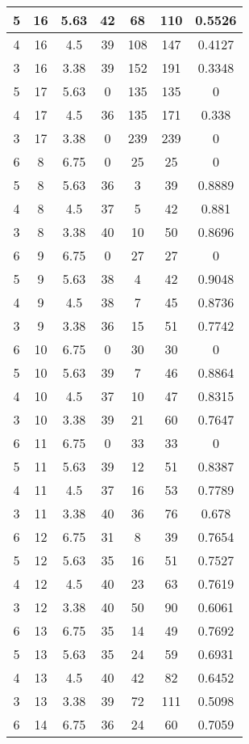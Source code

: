 \documentclass[letterpaper, 12pt]{article}
\begin{document}
\begin{longtable}{|c|c|c|c|c|c|c|}
\hline
5 & 16 & 5.63 & 42 & 68 & 110 & 0.5526 \\
\hline
4 & 16 & 4.5 & 39 & 108 & 147 & 0.4127 \\
\hline
3 & 16 & 3.38 & 39 & 152 & 191 & 0.3348 \\
\hline
5 & 17 & 5.63 & 0 & 135 & 135 & 0 \\
\hline
4 & 17 & 4.5 & 36 & 135 & 171 & 0.338 \\
\hline
3 & 17 & 3.38 & 0 & 239 & 239 & 0 \\
\hline
6 & 8 & 6.75 & 0 & 25 & 25 & 0 \\
\hline
5 & 8 & 5.63 & 36 & 3 & 39 & 0.8889 \\
\hline
4 & 8 & 4.5 & 37 & 5 & 42 & 0.881 \\
\hline
3 & 8 & 3.38 & 40 & 10 & 50 & 0.8696 \\
\hline
6 & 9 & 6.75 & 0 & 27 & 27 & 0 \\
\hline
5 & 9 & 5.63 & 38 & 4 & 42 & 0.9048 \\
\hline
4 & 9 & 4.5 & 38 & 7 & 45 & 0.8736 \\
\hline
3 & 9 & 3.38 & 36 & 15 & 51 & 0.7742 \\
\hline
6 & 10 & 6.75 & 0 & 30 & 30 & 0 \\
\hline
5 & 10 & 5.63 & 39 & 7 & 46 & 0.8864 \\
\hline
4 & 10 & 4.5 & 37 & 10 & 47 & 0.8315 \\
\hline
3 & 10 & 3.38 & 39 & 21 & 60 & 0.7647 \\
\hline
6 & 11 & 6.75 & 0 & 33 & 33 & 0 \\
\hline
5 & 11 & 5.63 & 39 & 12 & 51 & 0.8387 \\
\hline
4 & 11 & 4.5 & 37 & 16 & 53 & 0.7789 \\
\hline
3 & 11 & 3.38 & 40 & 36 & 76 & 0.678 \\
\hline
6 & 12 & 6.75 & 31 & 8 & 39 & 0.7654 \\
\hline
5 & 12 & 5.63 & 35 & 16 & 51 & 0.7527 \\
\hline
4 & 12 & 4.5 & 40 & 23 & 63 & 0.7619 \\
\hline
3 & 12 & 3.38 & 40 & 50 & 90 & 0.6061 \\
\hline
6 & 13 & 6.75 & 35 & 14 & 49 & 0.7692 \\
\hline
5 & 13 & 5.63 & 35 & 24 & 59 & 0.6931 \\
\hline
4 & 13 & 4.5 & 40 & 42 & 82 & 0.6452 \\
\hline
3 & 13 & 3.38 & 39 & 72 & 111 & 0.5098 \\
\hline
6 & 14 & 6.75 & 36 & 24 & 60 & 0.7059 \\

\end{longtable}
\end{document}
